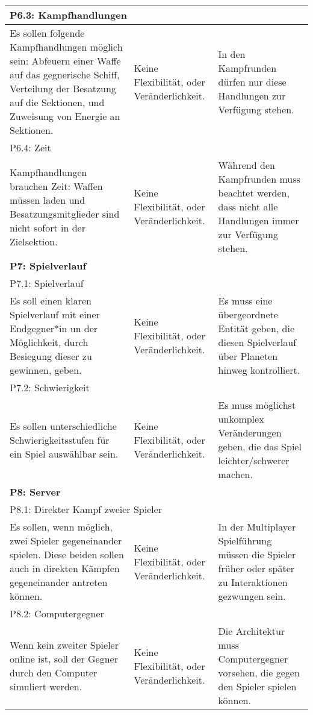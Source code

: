 \documentclass[fontsize=12pt,paper=a4,twoside]{scrartcl}
\begin{document}
\begin{longtable}[c]{|p{5cm}|p{5cm}|p{5cm}|}
\\ \hline
\multicolumn{3}{|l|}{{P6.3: Kampfhandlungen}} 
\\ \hline
Es sollen folgende Kampfhandlungen möglich sein: Abfeuern einer Waffe auf das gegnerische Schiff, Verteilung der Besatzung auf die Sektionen, und Zuweisung von Energie an Sektionen. & Keine Flexibilität, oder Veränderlichkeit.    &  In den Kampfrunden dürfen nur diese Handlungen zur Verfügung stehen.
\\ \hline
\multicolumn{3}{|l|}{{P6.4: Zeit}} 
\\ \hline
Kampfhandlungen brauchen Zeit: Waffen müssen laden und Besatzungsmitglieder sind nicht sofort in der Zielsektion. & Keine Flexibilität, oder Veränderlichkeit.    & Während den Kampfrunden muss beachtet werden, dass nicht alle Handlungen immer zur Verfügung stehen. 
\\ \hline
%
\multicolumn{3}{|l|}{{\textbf{P7: Spielverlauf}}} 
\\ \hline
\multicolumn{3}{|l|}{{P7.1: Spielverlauf}} 
\\ \hline
Es soll einen klaren Spielverlauf mit einer Endgegner*in un der Möglichkeit, durch Besiegung dieser zu gewinnen, geben.  & Keine Flexibilität, oder Veränderlichkeit.    & Es muss eine übergeordnete Entität geben, die diesen Spielverlauf über Planeten hinweg kontrolliert. 
\\ \hline
\multicolumn{3}{|l|}{{P7.2: Schwierigkeit}} 
\\ \hline
Es sollen unterschiedliche Schwierigkeitsstufen für ein Spiel auswählbar sein. & Keine Flexibilität, oder Veränderlichkeit.    & Es muss möglichst unkomplex Veränderungen geben, die das Spiel leichter/schwerer machen. 
\\ \hline
%
\multicolumn{3}{|l|}{{\textbf{P8: Server}}} 
\\ \hline
\multicolumn{3}{|l|}{{P8.1: Direkter Kampf zweier Spieler}} 
\\ \hline
Es sollen, wenn möglich, zwei Spieler gegeneinander spielen. Diese beiden sollen auch in direkten Kämpfen gegeneinander antreten können. & Keine Flexibilität, oder Veränderlichkeit.  & In der Multiplayer Spielführung müssen die Spieler früher oder später zu Interaktionen gezwungen sein. 
\\ \hline
\multicolumn{3}{|l|}{{P8.2: Computergegner}} 
\\ \hline
Wenn kein zweiter Spieler online ist, soll der Gegner durch den Computer simuliert werden. & Keine Flexibilität, oder Veränderlichkeit.    & Die Architektur muss Computergegner vorsehen, die gegen den Spieler spielen können. 

\end{longtable}
\end{document}
